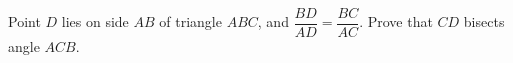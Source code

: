 Point $D$ lies on side $AB$ of triangle $ABC$, and $\dfrac{BD}{AD}=\dfrac{BC}{AC}$. Prove that $CD$ bisects angle $ACB$.
